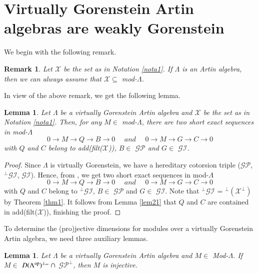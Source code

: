 \documentclass[11pt,a4paper]{article}
\newtheorem{lem}[thm]{Lemma}
\newtheorem{rem}[thm]{Remark}
\begin{document}
\section{ Virtually Gorenstein Artin algebras are weakly Gorenstein}

We begin with the following   remark.



\begin{rem}\label{rem21}  {\rm Let $\mathscr{X}$ be the set as in  Notation \ref{nota1}.  If    $\Lambda$ is an Artin algebra,
then we can always assume that $\mathscr{X} \subseteq $ mod-$\Lambda$.}\end{rem}

In view of the above remark, we get the following lemma.
\begin{lem}\label{lem22}   Let    $\Lambda$ be a virtually
Gorenstein Artin algebra and $\mathscr{X}$ be the set as in {\rm Notation \ref{nota1}}. Then, for any  $M\in $  {\rm mod}-$\Lambda$, there are two short exact sequences in  {\rm mod}-$\Lambda$
 $$0 \rightarrow M  \rightarrow Q  \rightarrow B \rightarrow 0 \ \ \ \ \ \ and  \ \ \ \ \ \ 0 \rightarrow M  \rightarrow G  \rightarrow C \rightarrow 0$$
 with  $Q  $ and  $C  $ belong to {\rm add(filt($\mathscr{X}$))},  $B\in $  $\mathscr{GP}$ and $G\in $  $\mathscr{GI}$. \end{lem}

 \begin{proof} Since $\Lambda$ is  virtually
Gorenstein, we have a  hereditary  cotorsion triple ($\mathscr{GP}$,  $^\perp\mathscr{GI}$, $\mathscr{GI}$).
 Hence, from \cite[Theorem 8.2(vi)]{bel}, we get two short exact sequences in  {\rm mod}-$\Lambda$
 $$0 \rightarrow M  \rightarrow Q  \rightarrow B \rightarrow 0 \ \ \ \ \ \ and  \ \ \ \ \ \ 0 \rightarrow M  \rightarrow G  \rightarrow C \rightarrow 0$$
 with  $Q  $ and  $C  $ belong to $^\perp\mathscr{GI}$,  $B\in $  $\mathscr{GP}$ and $G\in $  $\mathscr{GI}$.
Note that  $^\perp\mathscr{GI}$ = $^\perp(\mathscr{X}^\perp)$ by Theorem \ref{thm1}. It follows from   Lemma  \ref{lem21} that  $Q  $ and  $C  $ are contained in  {\rm add(filt($\mathscr{X}$))},
finishing the proof.\end{proof}

To determine the  (pro)jective dimensions for   modules over a  virtually
Gorenstein Artin algebra,  we need three auxiliary lemmas.



\begin{lem}\label{lem81}   Let    $\Lambda$ be a virtually
Gorenstein Artin algebra and   $M\in $  {\rm Mod}-$\Lambda$. If   $M \in $ ${D(\Lambda^{{\rm op}})}^{\perp_{\infty}}\ \cap $ $\mathscr{GP}^\perp$,
  then $M $ is injective.\end{lem}
\end{document}
